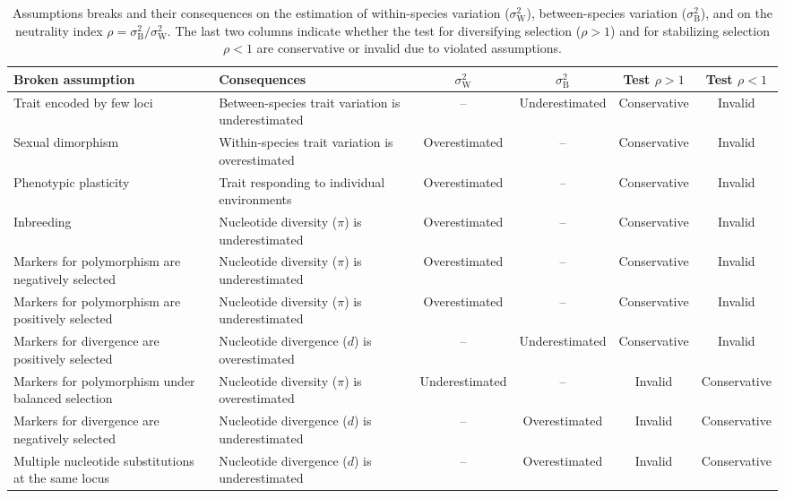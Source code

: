 \documentclass{article}
\newcommand{\RateBetween}{\sigma^2_{\mathrm{B}}}
\newcommand{\RateWhithin}{\sigma^2_{\mathrm{W}}}
\newcommand{\NI}{\rho}
\begin{document}
\begin{table}[t!]
    \centering
    \begin{adjustbox}{width = 1.0\textwidth}
        \begin{tabular}{||l|l||c|c||c|c||}
            \hline
            Broken assumption                                       & Consequences                                       & $\RateWhithin$   & $\RateBetween$   & Test $\NI > 1$ & Test $\NI < 1$ \\ \hline \hline
            Trait encoded by few loci                        & Between-species trait variation is underestimated & --              & Underestimated & Conservative & Invalid  \\ \hline
            Sexual dimorphism                                & Within-species trait variation is overestimated   & Overestimated & -- & Conservative & Invalid  \\ \hline
            Phenotypic plasticity & Trait responding to individual environments  & Overestimated & -- & Conservative & Invalid  \\ \hline
            Inbreeding                                       & Nucleotide diversity ($\pi$) is underestimated    & Overestimated  & --              & Conservative & Invalid  \\ \hline
            Markers for polymorphism are negatively selected & Nucleotide diversity ($\pi$) is underestimated  & Overestimated & -- & Conservative & Invalid  \\ \hline
            Markers for polymorphism are positively selected & Nucleotide diversity ($\pi$) is underestimated  & Overestimated & -- & Conservative & Invalid  \\ \hline
            Markers for divergence are positively selected   & Nucleotide divergence ($d$) is overestimated & -- & Underestimated & Conservative & Invalid  \\ \hline
            Markers for polymorphism under balanced selection & Nucleotide diversity ($\pi$) is overestimated  & Underestimated & -- & Invalid & Conservative  \\ \hline
            Markers for divergence are negatively selected   & Nucleotide divergence ($d$) is underestimated & -- & Overestimated & Invalid & Conservative  \\ \hline
            Multiple nucleotide substitutions at the same locus & Nucleotide divergence ($d$) is underestimated & -- & Overestimated & Invalid & Conservative  \\\hline \hline
        \end{tabular}
    \end{adjustbox}
    \caption{Assumptions breaks and their consequences on the estimation of within-species variation ($\RateWhithin$), between-species variation ($\RateBetween$), and on the neutrality index $\NI = \RateBetween/\RateWhithin$.
    The last two columns indicate whether the test for diversifying selection ($\NI > 1$) and for stabilizing selection $\NI < 1$ are conservative or invalid due to violated assumptions.
    }
    \label{table:assumptions}
\end{table}
\end{document}
